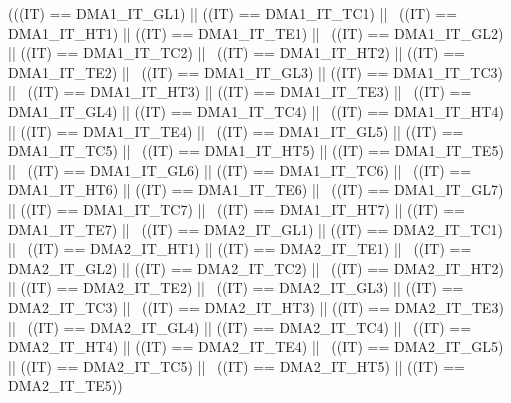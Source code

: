 \begin{DoxyCode}
(((IT) == DMA1_IT_GL1) || ((IT) == DMA1_IT_TC1) || \
                           ((IT) == DMA1_IT_HT1) || ((IT) == DMA1_IT_TE1) || \
                           ((IT) == DMA1_IT_GL2) || ((IT) == DMA1_IT_TC2) || \
                           ((IT) == DMA1_IT_HT2) || ((IT) == DMA1_IT_TE2) || \
                           ((IT) == DMA1_IT_GL3) || ((IT) == DMA1_IT_TC3) || \
                           ((IT) == DMA1_IT_HT3) || ((IT) == DMA1_IT_TE3) || \
                           ((IT) == DMA1_IT_GL4) || ((IT) == DMA1_IT_TC4) || \
                           ((IT) == DMA1_IT_HT4) || ((IT) == DMA1_IT_TE4) || \
                           ((IT) == DMA1_IT_GL5) || ((IT) == DMA1_IT_TC5) || \
                           ((IT) == DMA1_IT_HT5) || ((IT) == DMA1_IT_TE5) || \
                           ((IT) == DMA1_IT_GL6) || ((IT) == DMA1_IT_TC6) || \
                           ((IT) == DMA1_IT_HT6) || ((IT) == DMA1_IT_TE6) || \
                           ((IT) == DMA1_IT_GL7) || ((IT) == DMA1_IT_TC7) || \
                           ((IT) == DMA1_IT_HT7) || ((IT) == DMA1_IT_TE7) || \
                           ((IT) == DMA2_IT_GL1) || ((IT) == DMA2_IT_TC1) || \
                           ((IT) == DMA2_IT_HT1) || ((IT) == DMA2_IT_TE1) || \
                           ((IT) == DMA2_IT_GL2) || ((IT) == DMA2_IT_TC2) || \
                           ((IT) == DMA2_IT_HT2) || ((IT) == DMA2_IT_TE2) || \
                           ((IT) == DMA2_IT_GL3) || ((IT) == DMA2_IT_TC3) || \
                           ((IT) == DMA2_IT_HT3) || ((IT) == DMA2_IT_TE3) || \
                           ((IT) == DMA2_IT_GL4) || ((IT) == DMA2_IT_TC4) || \
                           ((IT) == DMA2_IT_HT4) || ((IT) == DMA2_IT_TE4) || \
                           ((IT) == DMA2_IT_GL5) || ((IT) == DMA2_IT_TC5) || \
                           ((IT) == DMA2_IT_HT5) || ((IT) == DMA2_IT_TE5))
\end{DoxyCode}
